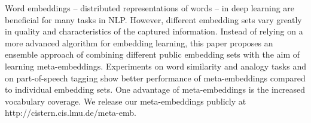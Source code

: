 Word embeddings -- distributed representations of words -- in deep learning are beneficial for many tasks in NLP. However, different embedding sets vary greatly in quality and characteristics of the captured information. Instead of relying on a more advanced algorithm for embedding learning, this paper proposes an ensemble approach of combining different public embedding sets with the aim of learning meta-embeddings. Experiments on word similarity and analogy tasks and on part-of-speech tagging show better performance of meta-embeddings compared to individual  embedding sets. One advantage of meta-embeddings is the increased vocabulary coverage. We release our meta-embeddings publicly at http://cistern.cis.lmu.de/meta-emb.
